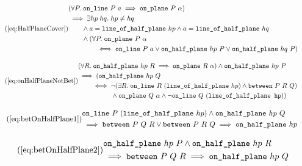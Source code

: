 \begin{equation}\tag{\ref{eq:HalfPlaneCover}}
  \begin{split}
    &(\forall P.\; \code{on\_line}\ P\ a \implies \code{on\_plane}\ P\ \alpha)\\
    &\implies \exists hp\; hq.\; hp \neq hq\\
    &\qquad \wedge a = \code{line\_of\_half\_plane}\ hp \wedge a = \code{line\_of\_half\_plane}\ hq\\
    &\qquad \wedge (\forall P.\; \code{on\_plane}\ P\ \alpha\\
    &\qquad\qquad \iff \code{on\_line}\ P\ a \vee \code{on\_half\_plane}\ hp\ P \vee \code{on\_half\_plane}\ hq\ P)
  \end{split}
\end{equation}

\begin{equation}\tag{\ref{eq:onHalfPlaneNotBet}}
  \begin{split}
    &(\forall R.\; \code{on\_half\_plane}\ hp\ R \implies \code{on\_plane}\ R\ \alpha) \wedge \code{on\_half\_plane}\ hp\ P\\
    &\implies (\code{on\_half\_plane}\ hp\ Q\\
    &\qquad \iff \neg(\exists R.\; \code{on\_line}\ R\ (\code{line\_of\_half\_plane}\ hp) \wedge \between{P}{R}{Q})\\
    &\qquad\qquad\quad \wedge \code{on\_plane}\ Q\ \alpha \wedge \neg\code{on\_line}\ Q\ (\code{line\_of\_half\_plane hp}))
  \end{split}
\end{equation}

\begin{equation}\tag{\ref{eq:betOnHalfPlane1}}
  \begin{split}
    &\code{on\_line}\ P\ (\code{line\_of\_half\_plane}\ hp) \wedge \code{on\_half\_plane}\ hp\ Q\\
    &\implies \between{P}{Q}{R} \vee \between{P}{R}{Q} \implies \code{on\_half\_plane}\ hp
  \end{split}
\end{equation}

\begin{equation}\tag{\ref{eq:betOnHalfPlane2}}
  \begin{split}
    &\code{on\_half\_plane}\ hp\ P \wedge \code{on\_half\_plane}\ hp\ R\\
    &\implies \between{P}{Q}{R} \implies \code{on\_half\_plane}\ hp\ Q
  \end{split}
\end{equation}

